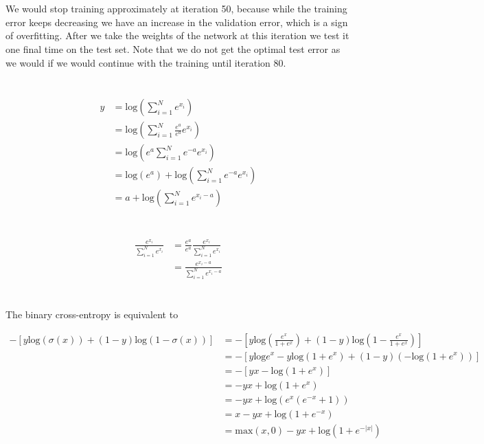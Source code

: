 \documentclass[11pt]{article}
\newcommand{\exercise}{\section{}}
\newcommand{\sumf}[3]{\sum_{#1}^{#2} #3}
\begin{document}
\exercise

\noindent We would stop training approximately at iteration 50, because while the training error keeps decreasing we have an increase in the validation error, which is a sign of overfitting. After we take the weights of the network at this iteration we test it one final time on the test set. Note that we do not get the optimal test error as we would if we would continue with the training until iteration 80.

\exercise

\begin{align*}
y &= \text{log}(\sumf{i=1}{N}{ e^{x_i} }) \\
&= \text{log}(\sumf{i=1}{N}{ \frac{e^a}{e^a} e^{x_i} }) \\
&= \text{log}(e^a \sumf{i=1}{N}{e^{-a} e^{x_i} }) \\
&= \text{log}(e^a) + \text{log}(\sumf{i=1}{N}{e^{-a} e^{x_i} }) \\
&= a + \text{log}(\sumf{i=1}{N}{e^{x_i - a} })
\end{align*}

\exercise

\begin{align*}
\frac{e^{x_i}}{\sumf{i=1}{N}{e^{x_i}}} &= \frac{e^{a}}{e^{a}} \frac{e^{x_i}}{\sumf{i=1}{N}{e^{x_i}}} \\
&= \frac{e^{x_i - a}}{\sumf{i=1}{N}{e^{x_i - a}}}
\end{align*}

\exercise

\noindent The binary cross-entropy is equivalent to

\begin{align*}
-[y \text{log}(\sigma(x)) + (1 - y) \text{log}(1 - \sigma(x)) ] &= -[y \text{log}(\frac{e^x}{1 + e^x}) + (1 - y) \text{log}(1 - \frac{e^x}{1 + e^x}) ] \\
&= -[ y \text{log}e^x -y \text{log}(1 + e^x) + (1 - y)( -\text{log}(1 + e^x ))] \\
&= -[yx - \text{log}(1 + e^x )] \\
&= -yx + \text{log}(1 + e^x ) \\
&= -yx + \text{log}(e^x(e^{-x} + 1 )) \\
&= x -yx + \text{log}( 1 + e^{-x} ) \\
&= \text{max}(x,0) -yx + \text{log}( 1 + e^{-|x|} ) \tag{see below}
\end{align*}
\end{document}
